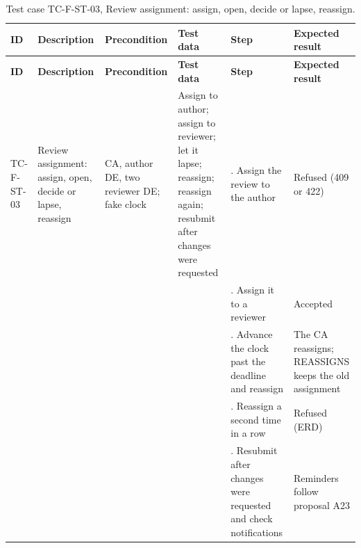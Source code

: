 {\footnotesize{}\renewcommand{\arraystretch}{1.1}
\begin{longtable}{|>{\raggedright\arraybackslash}p{}|>{\raggedright\arraybackslash}p{}|>{\raggedright\arraybackslash}p{}|>{\raggedright\arraybackslash}p{}|>{\raggedright\arraybackslash}p{}|>{\raggedright\arraybackslash}p{}|}
\caption{Test case TC-F-ST-03, Review assignment: assign, open, decide or lapse, reassign.} \\
\hline
\textbf{ID} & \textbf{Description} & \textbf{Precondition} & \textbf{Test data} & \textbf{Step} & \textbf{Expected result} \\ \hline
\endfirsthead
\hline
\textbf{ID} & \textbf{Description} & \textbf{Precondition} & \textbf{Test data} & \textbf{Step} & \textbf{Expected result} \\ \hline
\endhead
TC-F-ST-03 & Review assignment: assign, open, decide or lapse, reassign & CA, author DE, two reviewer DE; fake clock & Assign to author; assign to reviewer; let it lapse; reassign; reassign again; resubmit after changes were requested & 1. Assign the review to the author & Refused (409 or 422) \\ \cline{5-6}
 &  &  &  & 2. Assign it to a reviewer & Accepted \\ \cline{5-6}
 &  &  &  & 3. Advance the clock past the deadline and reassign & The CA reassigns; REASSIGNS keeps the old assignment \\ \cline{5-6}
 &  &  &  & 4. Reassign a second time in a row & Refused (ERD) \\ \cline{5-6}
 &  &  &  & 5. Resubmit after changes were requested and check notifications & Reminders follow proposal A23 \\ \hline
\end{longtable}
}

